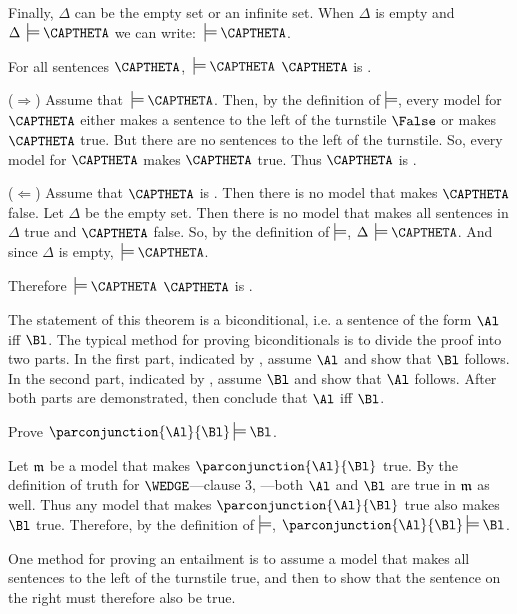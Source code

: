 \noindent{}Finally, $\Delta$ can be the empty set or an infinite set.
When $\Delta$ is empty and $\Delta\:\sdtstile{}{}\CAPTHETA$ we can write: $\:\sdtstile{}{}\CAPTHETA$.

\begin{THEOREM}{}
	For all \GSL{} sentences $\CAPTHETA$, $\:\sdtstile{}{}\CAPTHETA$ \Iff $\CAPTHETA$ is .
\end{THEOREM} 
\begin{PROOF}
	($\Rightarrow$) Assume that $\:\sdtstile{}{}\CAPTHETA$.
	Then, by the definition of $\sdtstile{}{}$, every model for $\CAPTHETA$ either makes a sentence to the left of the turnstile $\False$ or makes $\CAPTHETA$ true. 
	But there are no sentences to the left of the turnstile.
	So, every model for $\CAPTHETA$ makes $\CAPTHETA$ true.
	Thus $\CAPTHETA$ is .

	($\Leftarrow$) Assume that $\CAPTHETA$ is .
	Then there is no model that makes $\CAPTHETA$ false.
	Let $\Delta$ be the empty set.
	Then there is no model that makes all sentences in $\Delta$ true and $\CAPTHETA$ false.
	So, by the definition of $\sdtstile{}{}$, $\Delta\:\sdtstile{}{}\CAPTHETA$.
	And since $\Delta$ is empty, $\:\sdtstile{}{}\CAPTHETA$.

	Therefore $\:\sdtstile{}{}\CAPTHETA$ \Iff $\CAPTHETA$ is .
\end{PROOF}
\begin{commentary}
	The statement of this theorem is a biconditional, i.e. a sentence of the form $\Al$ iff $\Bl$.
	The typical method for proving biconditionals is to divide the proof into two parts.
	In the first part, indicated by \mention{($\Rightarrow$)}, assume $\Al$ and show that $\Bl$ follows.
	In the second part, indicated by \mention{($\Leftarrow$)}, assume $\Bl$ and show that $\Al$ follows.
	After both parts are demonstrated, then conclude that $\Al$ iff $\Bl$.
\end{commentary}

\begin{majorILnc}{}
Prove $\parconjunction{\Al}{\Bl}\sdtstile{}{}\Bl$. 
\end{majorILnc}
\begin{PROOF}
Let $\mathfrak{m}$ be a model that makes $\parconjunction{\Al}{\Bl}$ true. 
By the definition of truth for $\WEDGE$---clause 3, ---both $\Al$ and $\Bl$ are true in $\mathfrak{m}$ as well. 
Thus any model that makes $\parconjunction{\Al}{\Bl}$ true also makes $\Bl$ true.
Therefore, by the definition of $\sdtstile{}{}$, $\parconjunction{\Al}{\Bl}\sdtstile{}{}\Bl$.
\end{PROOF}
\begin{commentary}
	One method for proving an entailment is to assume a model that makes all sentences to the left of the turnstile true, and then to show that the sentence on the right must therefore also be true.
\end{commentary}

